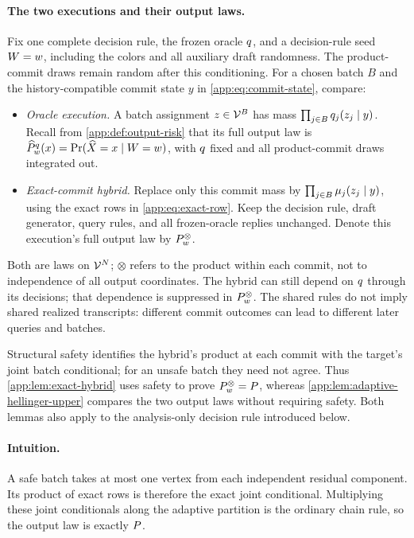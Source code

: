 \paragraph{The two executions and their output laws.}
Fix one complete decision rule, the frozen oracle $\FrozenOracle$, and a
decision-rule seed $\ControllerSeed=w$, including the colors and all
auxiliary draft randomness.  The product-commit draws remain random after
this conditioning.  For a chosen batch $B$ and the history-compatible
commit state $y$ in \eqref{app:eq:commit-state}, compare:
\begin{itemize}
\item \emph{Oracle execution.}
A batch assignment $z\in\Vocab^B$ has mass
$\prod_{j\in B}\OracleRowMass{y}{j}{z_j}$.
Recall from \textcolor{red}{\cref{app:def:output-risk}} that its full output law is
$\SamplerOutputLaw{w}{\FrozenOracle}(x)
 =\Pr(\SamplerOutput=x\mid\ControllerSeed=w)$, with $\FrozenOracle$ fixed
and all product-commit draws integrated out.
\item \emph{Exact-commit hybrid.}
Replace only this commit mass by
$\prod_{j\in B}\ExactRowMass{y}{j}{z_j}$, using the exact rows in
\eqref{app:eq:exact-row}.  Keep the decision rule, draft generator, query
rules, and all frozen-oracle replies unchanged.
Denote this execution's full output law by $\ExactCommitOutputLaw{w}$.
\end{itemize}
Both are laws on $\Vocab^N$; $\otimes$ refers to the product within each
commit, not to independence of all output coordinates.
The hybrid can still depend on $\FrozenOracle$ through its decisions;
that dependence is suppressed in $\ExactCommitOutputLaw{w}$.
The shared rules do not imply shared realized transcripts: different commit
outcomes can lead to different later queries and batches.

Structural safety identifies the hybrid's product at each commit with the
target's joint batch conditional; for an unsafe batch they need not agree.
Thus \cref{app:lem:exact-hybrid} uses safety to prove
$\ExactCommitOutputLaw{w}=\TargetLaw$, whereas
\cref{app:lem:adaptive-hellinger-upper} compares the two output laws without
requiring safety.  Both lemmas also apply to the analysis-only decision rule
introduced below.

\paragraph{Intuition.}
A safe batch takes at most one vertex from each independent residual
component.  Its product of exact rows is therefore the exact joint
conditional.  Multiplying these joint conditionals along the adaptive
partition is the ordinary chain rule, so the output law is exactly
$\TargetLaw$.

